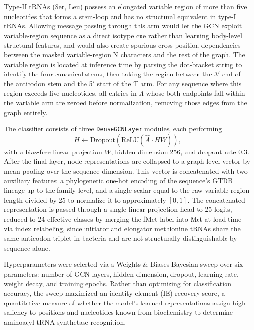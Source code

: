 \documentclass{article}
\begin{document}
Type-II tRNAs (Ser, Leu) possess an elongated variable region of more than five nucleotides that forms a stem-loop and has no structural equivalent in type-I tRNAs. Allowing message passing through this arm would let the GCN exploit variable-region sequence as a direct isotype cue rather than learning body-level structural features, and would also create spurious cross-position dependencies between the masked variable-region N characters and the rest of the graph. The variable region is located at inference time by parsing the dot-bracket string to identify the four canonical stems, then taking the region between the 3$'$ end of the anticodon stem and the 5$'$ start of the T arm. For any sequence where this region exceeds five nucleotides, all entries in $A$ whose both endpoints fall within the variable arm are zeroed before normalization, removing those edges from the graph entirely.

The classifier consists of three \texttt{DenseGCNLayer} modules, each performing
\[
H \leftarrow \text{Dropout}(\text{ReLU}(\hat{A} \cdot H W)),
\]
with a bias-free linear projection $W$, hidden dimension 256, and dropout rate 0.3. After the final layer, node representations are collapsed to a graph-level vector by mean pooling over the sequence dimension. This vector is concatenated with two auxiliary features: a phylogenetic one-hot encoding of the sequence's GTDB lineage up to the family level, and a single scalar equal to the raw variable region length divided by 25 to normalize it to approximately $[0, 1]$. The concatenated representation is passed through a single linear projection head to 25 logits, reduced to 24 effective classes by merging the fMet label into Met at load time via index relabeling, since initiator and elongator methionine tRNAs share the same anticodon triplet in bacteria and are not structurally distinguishable by sequence alone.

Hyperparameters were selected via a Weights \& Biases Bayesian sweep over six parameters: number of GCN layers, hidden dimension, dropout, learning rate, weight decay, and training epochs. Rather than optimizing for classification accuracy, the sweep maximized an identity element (IE) recovery score, a quantitative measure of whether the model's learned representations assign high saliency to positions and nucleotides known from biochemistry to determine aminoacyl-tRNA synthetase recognition.
\end{document}
